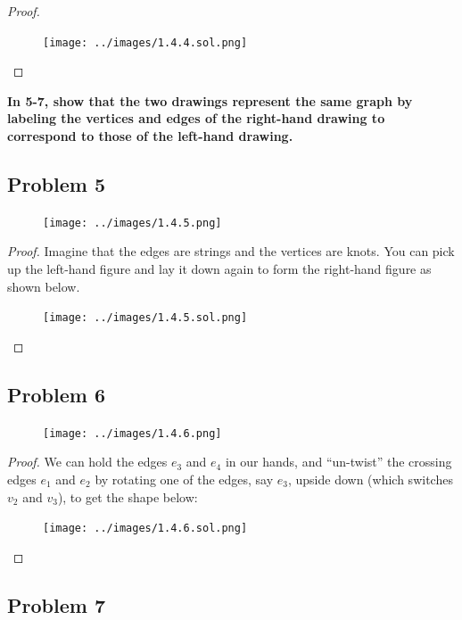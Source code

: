 \documentclass[14pt]{extarticle}
\begin{document}
\begin{proof}
\begin{figure}[ht!]
\centering
\texttt{[image: ../images/1.4.4.sol.png]}
\end{figure}
\end{proof}

{\bf In 5-7, show that the two drawings represent the same graph by labeling
the vertices and edges of the right-hand drawing to correspond to those of the
left-hand drawing.}

\subsection{Problem 5}

\begin{figure}[ht!]
\centering
\texttt{[image: ../images/1.4.5.png]}
\end{figure}

\begin{proof}
Imagine that the edges are strings and the vertices are knots. You can pick up
the left-hand figure and lay it down again to form the right-hand figure as
shown below.

\begin{figure}[ht!]
\centering
\texttt{[image: ../images/1.4.5.sol.png]}
\end{figure}
\end{proof}

\subsection{Problem 6}
\begin{figure}[ht!]
\centering
\texttt{[image: ../images/1.4.6.png]}
\end{figure}


\begin{proof}
We can hold the edges $e_3$ and $e_4$ in our hands, and ``un-twist'' the
crossing edges $e_1$ and $e_2$ by rotating one of the edges, say $e_3$, upside
down (which switches $v_2$ and $v_3$), to get the shape below:

\begin{figure}[ht!]
\centering
\texttt{[image: ../images/1.4.6.sol.png]}
\end{figure}

\end{proof}

\subsection{Problem 7}
\end{document}
